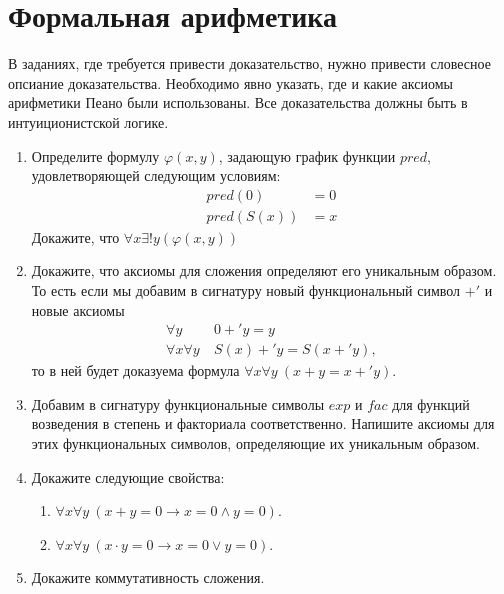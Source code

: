\section*{Формальная арифметика}

В заданиях, где требуется привести доказательство, нужно привести словесное опсиание доказательства.
Необходимо явно указать, где и какие аксиомы арифметики Пеано были использованы.
Все доказательства должны быть в интуиционистской логике.
\begin{enumerate}
	
\item Определите формулу $\varphi(x,y)$, задающую график функции $pred$, удовлетворяющей следующим условиям:
\begin{align*}
pred(0) & = 0 \\
pred(S(x)) & = x
\end{align*}
Докажите, что $\forall x \exists! y (\varphi(x,y))$

\item Докажите, что аксиомы для сложения определяют его уникальным образом.
    То есть если мы добавим в сигнатуру новый функциональный символ $+'$ и новые аксиомы
\begin{align*}
\forall y\ & 0 +' y = y \tag{$+'0$} \\
\forall x \forall y\ & S(x) +' y = S(x +' y) \tag{$+'S$},
\end{align*}
то в ней будет доказуема формула $\forall x \forall y\ (x + y = x +' y)$.

\item Добавим в сигнатуру функциональные символы $exp$ и $fac$ для функций возведения в степень и факториала
соответственно.
    Напишите аксиомы для этих функциональных символов, определяющие их уникальным образом.

\item Докажите следующие свойства:
\begin{enumerate}
\item $\forall x \forall y\ (x + y = 0 \to x = 0 \land y = 0)$.
\item $\forall x \forall y\ (x \cdot y = 0 \to x = 0 \lor y = 0)$.
\end{enumerate}

\item Докажите коммутативность сложения.

\end{enumerate}

